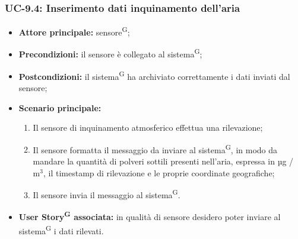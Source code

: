 \documentclass[8pt]{article}
\newcommand{\glossterm}[1]{#1\textsuperscript{G}} %
\begin{document}
\subsubsection*{UC-9.4: Inserimento dati inquinamento dell'aria}
\begin{itemize}
    \item \textbf{Attore principale:} \glossterm{sensore};
    \item \textbf{Precondizioni:} il sensore è collegato al \glossterm{sistema};
    \item \textbf{Postcondizioni:} il \glossterm{sistema} ha archiviato correttamente i dati inviati dal sensore;
    \item \textbf{Scenario principale:}
        \begin{enumerate}
        \item Il sensore di inquinamento atmosferico effettua una rilevazione;
        \item Il sensore formatta il messaggio da inviare al \glossterm{sistema}, in modo da mandare la quantità di polveri sottili presenti nell'aria, espressa in µg / $\mbox{m}^{\mbox{3}}$, il timestamp di rilevazione e le proprie
coordinate geografiche;
        \item Il sensore invia il messaggio al \glossterm{sistema}.
        \end{enumerate}
    \item \textbf{\glossterm{User Story} associata:} in qualità di sensore desidero poter inviare al \glossterm{sistema} i
        dati rilevati.
\end{itemize}
\end{document}
